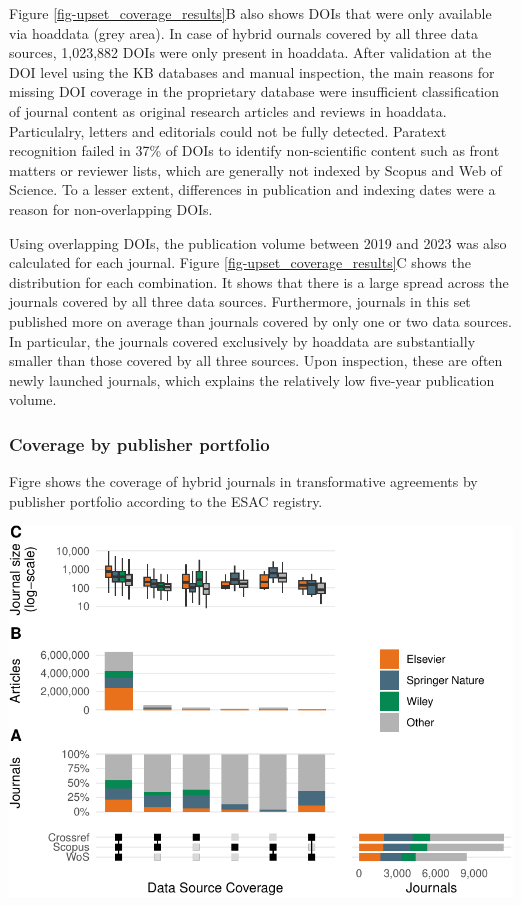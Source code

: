 \documentclass[a4paper,man,floatsintext,longtable,noextraspace,10pt]{apa6}
\begin{document}
Figure \ref{fig-upset_coverage_results}B also shows DOIs that were only
available via hoaddata (grey area). In case of hybrid ournals covered by
all three data sources, 1,023,882 DOIs were only present in hoaddata.
After validation at the DOI level using the KB databases and manual
inspection, the main reasons for missing DOI coverage in the proprietary
database were insufficient classification of journal content as original
research articles and reviews in hoaddata. Particulalry, letters and
editorials could not be fully detected. Paratext recognition failed in
37\% of DOIs to identify non-scientific content such as front matters or
reviewer lists, which are generally not indexed by Scopus and Web of
Science. To a lesser extent, differences in publication and indexing
dates were a reason for non-overlapping DOIs.

Using overlapping DOIs, the publication volume between 2019 and 2023 was
also calculated for each journal. Figure
\ref{fig-upset_coverage_results}C shows the distribution for each
combination. It shows that there is a large spread across the journals
covered by all three data sources. Furthermore, journals in this set
published more on average than journals covered by only one or two data
sources. In particular, the journals covered exclusively by hoaddata are
substantially smaller than those covered by all three sources. Upon
inspection, these are often newly launched journals, which explains the
relatively low five-year publication volume.

\subsubsection{Coverage by publisher
portfolio}\label{coverage-by-publisher-portfolio}

Figre shows the coverage of hybrid journals in transformative agreements
by publisher portfolio according to the ESAC registry.

\begin{center}
\includegraphics[width=0.99\linewidth,height=\textheight,keepaspectratio]{fig/upset_publisher_plot-1.pdf}
\end{center}
\end{document}
